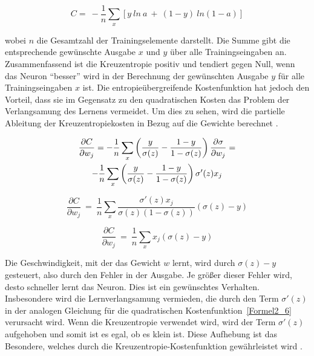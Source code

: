     \begin{equation} \label{Formel2_8}
        C=\ -\frac{1}{n}\sum _{x}[ y\ ln\ a\ +\ ( 1-y) \ ln( 1-a)]
    \end{equation}

    wobei $n$ die Gesamtzahl der Trainingselemente darstellt. Die Summe gibt die entsprechende gewünschte Ausgabe $x$ und $y$ über alle Trainingseingaben an. Zusammenfassend ist die Kreuzentropie positiv und tendiert gegen Null, wenn das Neuron
    \enquote{besser} wird in der Berechnung der gewünschten Ausgabe $y$ für alle Trainingseingaben $x$ ist.  Die entropieübergreifende Kostenfunktion hat jedoch den Vorteil, dass sie im Gegensatz zu den quadratischen Kosten das Problem der Verlangsamung des Lernens vermeidet. Um dies zu sehen, wird die partielle Ableitung der Kreuzentropiekosten in Bezug auf die Gewichte berechnet \cite*[63]{Nielsen2015}.

    \begin{gather} \label{Formel2_9}
        \frac{\partial C}{\partial w_{j}} =-\frac{1}{n}\sum _{x}\left(\frac{y}{\sigma ( z)} -\frac{1-y}{1-\sigma ( z)}\right)\frac{\partial \sigma }{\partial w_{j}} = \notag\\
        -\frac{1}{n}\sum _{x}\left(\frac{y}{\sigma ( z)} -\frac{1-y}{1-\sigma ( z)}\right) \sigma '( z) x_{j}
    \end{gather}

    \begin{equation} \label{Formel2_10}
        \frac{\partial C}{\partial w_{j}} \ =\ \frac{1}{n}\sum _{x}\frac{\sigma '( z) x_{j}}{\sigma ( z)( 1-\sigma ( z))}( \sigma ( z) -y)
    \end{equation}

    \begin{equation} \label{Formel2_11}
        \frac{\partial C}{\partial w_{j}} \ =\ \frac{1}{n}\sum _{x} x_{j}( \sigma ( z) -y)
    \end{equation}


    Die Geschwindigkeit, mit der das Gewicht $w$ lernt, wird durch $\sigma(z) - y$ gesteuert, also durch den Fehler in der Ausgabe. Je größer dieser Fehler wird, desto schneller lernt das Neuron. Dies ist ein gewünschtes Verhalten. Insbesondere wird die Lernverlangsamung vermieden, die durch den Term $\sigma'(z)$ in der analogen Gleichung für die quadratischen Kostenfunktion~\ref{Formel2_6} verursacht wird. Wenn die Kreuzentropie verwendet wird, wird der Term $\sigma'(z)$ aufgehoben und somit ist es egal, ob es klein ist. Diese Aufhebung ist das Besondere, welches durch die Kreuzentropie-Kostenfunktion gewährleistet wird \cite[63-64]{Nielsen2015}.

